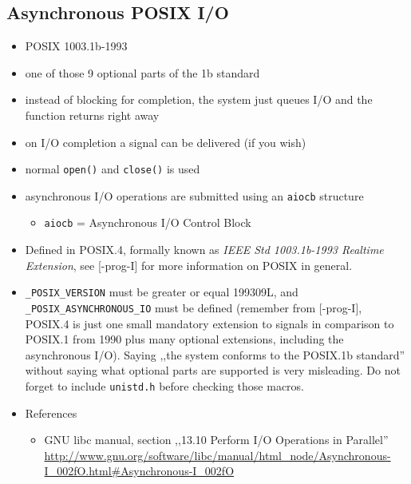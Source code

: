 \subsection{Asynchronous POSIX I/O}

\begin{itemize}
\item POSIX 1003.1b-1993
\item one of those 9 optional parts of the 1b standard
\item instead of blocking for completion, the system just queues I/O and the
function returns right away
\item on I/O completion a signal can be delivered (if you wish)
\item normal \texttt{open()} and \texttt{close()} is used
\item asynchronous I/O operations are submitted using an \texttt{aiocb} structure
	\begin{itemize}
	\item \texttt{aiocb} = Asynchronous I/O Control Block
	\end{itemize}
\end{itemize}

\label{ASYNCHRONOUS_IO}

\begin{itemize}
\item Defined in POSIX.4, formally known as \emph{IEEE Std 1003.1b-1993 Realtime
Extension}, see [\myun\myix-prog-I] for more information on POSIX in general.
\item \texttt{\_POSIX\_VERSION} must be greater or equal 199309L, and
\texttt{\_POSIX\_ASYNCHRO\-NOUS\_IO} must be defined (remember from
[\myun\myix-prog-I], POSIX.4 is just one small mandatory extension to signals in
comparison to POSIX.1 from 1990 plus many optional extensions, including the
asynchronous I/O). Saying ,,the system conforms to the POSIX.1b standard''
without saying what optional parts are supported is very misleading. Do not
forget to inc{}lude \texttt{unistd.h} before checking those macros.
\item References
	\begin{itemize}
	\item GNU libc manual, section ,,13.10 Perform I/O Operations in
	Parallel''
	\url{http://www.gnu.org/software/libc/manual/html\_node/Asynchronous-I\_002fO.html#Asynchronous-I\_002fO}
	\end{itemize}
\end{itemize}


